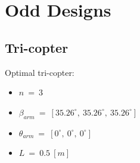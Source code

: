 \begin{table}[!h]
\begin{center}
 \caption{Comparison between two designs' hover capabilities.}\vspace{1ex}
 \label{tab:tab_Octa_compare_hover}
\end{center}
\end{table}

\section{Odd Designs}
\label{sec:odd_designs}

\subsection{Tri-copter}
\label{sec:tri_copter}
Optimal tri-copter:
\begin{itemize}
  \item $n\ =\ 3$
  \item $\beta_{arm}\ =\ [35.26^{\circ},\  35.26^{\circ},\  35.26^{\circ}]$
  \item $\theta_{arm}\ =\ [0^{\circ},\  0^{\circ},\  0^{\circ}]$
  \item $L\ =\ 0.5\ [m]$
\end{itemize}

